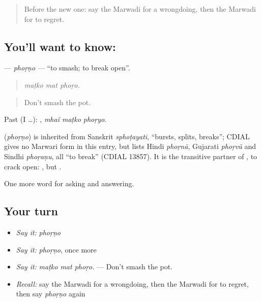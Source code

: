 \label{lesson:MW-C270-phorno}



\begin{quote}
Before the new one: say the Marwadi for a wrongdoing, then the Marwadi for to regret.
\end{quote}

\subsection*{You'll want to know: }
\textbf{} — \emph{phoṛṇo} — \textquotedblleft{}to smash; to break open\textquotedblright{}.

\begin{quote}
  
\end{quote}

\begin{quote}
\emph{maṭko mat phoṛo.}
\end{quote}

\begin{quote}
Don't smash the pot.
\end{quote}

Past (I …):   , \emph{mhaĩ maṭko phoṛyo}.

\begin{cousinweb}
\textbf{} (\emph{phoṛṇo}) is inherited from Sanskrit \emph{sphoṭayati}, \textquotedblleft{}bursts, splits, breaks\textquotedblright{}; CDIAL gives no Marwari form in this entry, but lists Hindi \emph{phoṛnā}, Gujarati \emph{phoṛvũ} and Sindhi \emph{phoṛaṇu}, all \textquotedblleft{}to break\textquotedblright{} (CDIAL 13857). It is the transitive partner of \textbf{}, to crack open: \textbf{ }, but \textbf{  }.
\end{cousinweb}

\begin{grammarlens}[title={What you've built}]
One more word for asking and answering.
\end{grammarlens}

\subsection*{Your turn}
\begin{itemize}
\raggedright
  \item \emph{Say it:} \emph{phoṛṇo}
  \item \emph{Say it:} \emph{phoṛṇo}, once more
  \item \emph{Say it:} \emph{maṭko mat phoṛo.} — Don't smash the pot.
  \item \emph{Recall:} say the Marwadi for a wrongdoing, then the Marwadi for to regret, then say \emph{phoṛṇo} again
\end{itemize}


